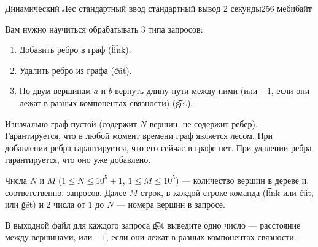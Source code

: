 \begin{problem}{Динамический Лес}      
{стандартный ввод}
{стандартный вывод}
{2 секунды}{256 мебибайт}

Вам нужно научиться обрабатывать 3 типа запросов:

\begin{enumerate}
  \item Добавить ребро в граф (\t{link}).
  \item Удалить ребро из графа (\t{cut}).
  \item По двум вершинам $a$ и $b$ вернуть длину пути между ними
    (или $-1$, если они лежат в разных компонентах связности) (\t{get}).
\end{enumerate}

Изначально граф пустой (содержит $N$ вершин, не содержит ребер).
Гарантируется, что в любой момент времени граф является лесом. При добавлении ребра гарантируется,
что его сейчас в графе нет. При удалении ребра гарантируется, что оно уже добавлено.

\InputFile

Числа $N$ и $M$ ($1 \le N \le 10^5 + 1$, $1 \le M \le 10^5$) --- количество вершин в дереве и, соответственно, запросов.
Далее $M$ строк, в каждой строке команда (\t{link} или \t{cut}, или \t{get}) и 2 числа от $1$ до $N$ ---
номера вершин в запросе.

\OutputFile

В выходной файл для каждого запроса \t{get} выведите одно число --- расстояние между вершинами, или $-1$, если
они лежат в разных компонентах связности.

\Example

\begin{example}
%
%
\end{example}

\end{problem}                           
